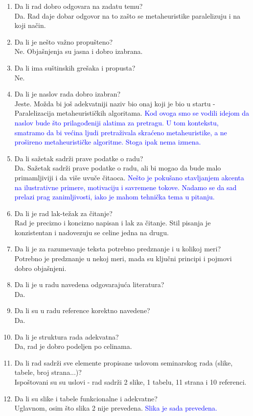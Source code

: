 \documentclass[a4paper]{report}
\newcommand{\odgovor}[1]{\textcolor{blue}{#1}}
\begin{document}
\begin{enumerate}
\item Da li rad dobro odgovara na zadatu temu?\\
Da. Rad daje dobar odgovor na to zašto se metaheuristike paralelizuju i na koji način.
\item Da li je nešto važno propušteno?\\
Ne. Objašnjenja su jasna i dobro izabrana.
\item Da li ima suštinskih grešaka i propusta?\\
Ne.
\item Da li je naslov rada dobro izabran?\\
Jeste. Možda bi još adekvatniji naziv bio onaj koji je bio u startu - Paralelizacija metaheurističkih algoritama. \odgovor{Kod ovoga smo se vodili idejom da naslov bude što prilagođeniji alatima za pretragu. U tom kontekstu, smatramo da bi većina ljudi pretraživala skraćeno metaheuristike, a ne prošireno metaheurističke algoritme. Stoga ipak nema izmena.}
\item Da li sažetak sadrži prave podatke o radu?\\
Da. Sažetak sadrži prave podatke o radu, ali bi mogao da bude malo primamljiviji i da više uvuče čitaoca. \odgovor{Nešto je pokušano stavljanjem akcenta na ilustrativne primere, motivaciju i savremene tokove. Nadamo se da sad prelazi prag zanimljivosti, iako je mahom tehnička tema u pitanju.}
\item Da li je rad lak-težak za čitanje?\\
Rad je precizno i koncizno napisan i lak za čitanje. Stil pisanja je konzistentan i nadovezuju se celine jedna na drugu.
\item Da li je za razumevanje teksta potrebno predznanje i u kolikoj meri?\\
Potrebno je predznanje u nekoj meri, mada su ključni principi i pojmovi dobro objašnjeni.
\item Da li je u radu navedena odgovarajuća literatura?\\
Da.
\item Da li su u radu reference korektno navedene?\\
Da.
\item Da li je struktura rada adekvatna?\\
Da, rad je dobro podeljen po celinama.
\item Da li rad sadrži sve elemente propisane uslovom seminarskog rada (slike, tabele, broj strana...)?\\
Ispoštovani su su uslovi - rad sadrži 2 slike, 1 tabelu, 11 strana i 10 referenci.  
\item Da li su slike i tabele funkcionalne i adekvatne?\\
Uglavnom, osim što slika 2 nije prevedena. \odgovor{Slika je sada prevedena.}
\end{enumerate}
\end{document}
